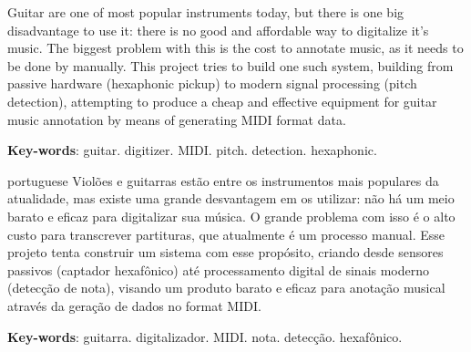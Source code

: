 \setlength{\absparsep}{18pt} %

\begin{summary}[Abstract]
  Guitar are one of most popular instruments today, but there is one big disadvantage
  to use it: there is no good and affordable way to digitalize it's music. The
  biggest problem with this is the cost to annotate music, as it needs to be done
  by manually. This project tries to build one such system, building from passive
  hardware (hexaphonic pickup) to modern signal processing (pitch detection),
  attempting to produce a cheap and effective equipment for guitar music annotation
  by means of generating MIDI format data.


  \textbf{Key-words}: guitar. digitizer. MIDI. pitch. detection. hexaphonic.
\end{summary}

\begin{summary}[Resumo]
  \begin{otherlanguage*}{portuguese}
    Violões e guitarras estão entre os instrumentos mais populares da atualidade,
    mas existe uma grande desvantagem em os utilizar: não há um meio barato e eficaz
    para digitalizar sua música. O grande problema com isso é o alto custo para
    transcrever partituras, que atualmente é um processo manual. Esse projeto tenta
    construir um sistema com esse propósito, criando desde sensores passivos (captador
    hexafônico) até processamento digital de sinais moderno (detecção de nota),
    visando um produto barato e eficaz para anotação musical através da geração de
    dados no format MIDI.

    \textbf{Key-words}: guitarra. digitalizador. MIDI. nota. detecção. hexafônico.
  \end{otherlanguage*}

\end{summary}

%
%
%
